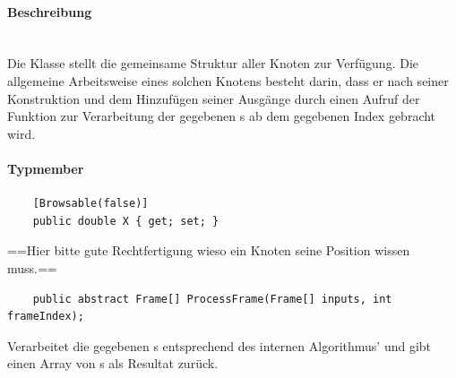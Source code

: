 \paragraph{Beschreibung}~\\
Die Klasse  stellt die gemeinsame Struktur aller Knoten zur Verfügung. Die allgemeine Arbeitsweise eines solchen Knotens besteht darin, dass er nach seiner Konstruktion und dem Hinzufügen seiner Ausgänge durch einen Aufruf der Funktion  zur Verarbeitung der gegebenen s ab dem gegebenen Index gebracht wird.

\paragraph{Typmember}
\begin{itemize}

	\begin{verbatim}
	[Browsable(false)]
	public double X { get; set; }
	\end{verbatim}
	==Hier bitte gute Rechtfertigung wieso ein Knoten seine Position wissen muss.==


	\begin{verbatim}
	public abstract Frame[] ProcessFrame(Frame[] inputs, int frameIndex);
	\end{verbatim}
	Verarbeitet die gegebenen s entsprechend des internen Algorithmus' und gibt einen Array von s als Resultat zurück.


\end{itemize}


